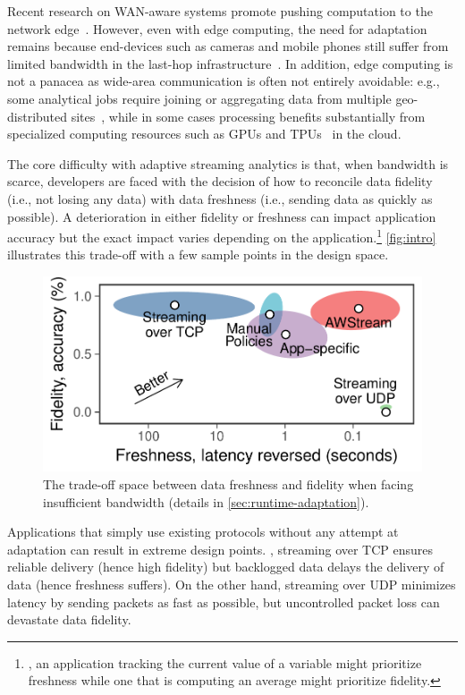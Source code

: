 Recent research on WAN-aware systems promote pushing computation to the network
edge~\cite{rabkin2014aggregation, satyanarayanan2009case}.  However, even with
edge computing, the need for adaptation remains because end-devices such as
cameras and mobile phones still suffer from limited bandwidth in the last-hop
infrastructure~\cite{abari2017enabling, zhang2015design}.  In addition, edge
computing is not a panacea as wide-area communication is often not entirely
avoidable: e.g., some analytical jobs require joining or aggregating data from
multiple geo-distributed sites~\cite{pu2015low, viswanathan2016clarinet}, while
in some cases processing benefits substantially from specialized computing
resources such as GPUs and TPUs~\cite{abadi2016tensorflow} in the cloud.

The core difficulty with adaptive streaming analytics is that, when bandwidth is
scarce, developers are faced with the decision of how to reconcile data fidelity
(i.e., not losing any data) with data freshness (i.e., sending data as quickly
as possible). A deterioration in either fidelity or freshness can impact
application accuracy but the exact impact varies depending on the
application.\footnote{, an application tracking the current value of a
  variable might prioritize freshness while one that is computing an average
  might prioritize fidelity.} \autoref{fig:intro} illustrates this trade-off
with a few sample points in the design space.

\begin{figure}
  \centering
  \includegraphics[width=0.8\columnwidth]{figures/figure1.pdf}
  \caption{The trade-off space between data freshness and fidelity when facing
    insufficient bandwidth (details in \autoref{sec:runtime-adaptation}).}
  \label{fig:intro}
  \vspace{-1em}
\end{figure}

Applications that simply use existing protocols without any attempt at
adaptation can result in extreme design points. , streaming over TCP ensures
reliable delivery (hence high fidelity) but backlogged data delays the delivery
of data (hence freshness suffers).  On the other hand, streaming over UDP
minimizes latency by sending packets as fast as possible, but uncontrolled
packet loss can devastate data fidelity.

